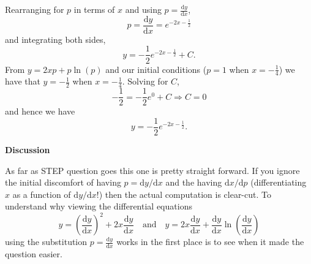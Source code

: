 \documentclass{article}
\begin{document}
Rearranging for $p$ in terms of $x$ and using $p = \frac{\mathrm{d}y}{\mathrm{d}x}$,
\[
p = \frac{\mathrm{d}y}{\mathrm{d}x} = e^{-2x-\frac{1}{2}}
\]
and integrating both sides,
\[
y = -\frac{1}{2}e^{-2x-\frac{1}{2}} + C.
\]
From $y=2xp+p\ln(p)$ and our initial conditions ($p=1$ when $x=-\frac{1}{4}$) we have that $y=-\frac{1}{2}$ when $x=-\frac{1}{4}$. Solving for $C$,
\[
-\frac{1}{2} = -\frac{1}{2}e^{0} + C \Rightarrow C=0
\]
and hence we have
\[
y = -\frac{1}{2}e^{-2x-\frac{1}{2}}.
\]

\newpage

\begin{center}
    \textbf{Discussion}
\end{center}

\vspace{0.5cm}

As far as STEP question goes this one is pretty straight forward. If you ignore the initial discomfort of having $p=\mathrm{d}y / \mathrm{d}x$ and the having $\mathrm{d}x / \mathrm{d}p$ (differentiating $x$ as a function of $\mathrm{d}y / \mathrm{d}x$!) then the actual computation is clear-cut. To understand why viewing the differential equations
\begin{equation*}
y = \left(\frac{\mathrm{d}y}{\mathrm{d}x} \right)^2 + 2x \frac{\mathrm{d}y}{\mathrm{d}x} \quad \text{and} \quad  y=2x \frac{\mathrm{d}y}{\mathrm{d}x} + \frac{\mathrm{d}y}{\mathrm{d}x} \ln \left(\frac{\mathrm{d}y}{\mathrm{d}x}\right)
\end{equation*}
using the substitution $p=\frac{\mathrm{d}y}{\mathrm{d}x}$ works in the first place is to see when it made the question easier.\par
\end{document}
